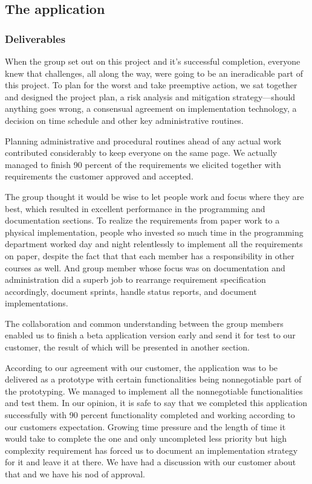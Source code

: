 \subsection{The application}
	
    \subsubsection{Deliverables}
    When the group set out on this project and it's successful completion, everyone knew that challenges, all along the way, were going to be an ineradicable part of this project. To plan for the worst and take preemptive action, we sat together and designed the project plan, a risk analysis and mitigation strategy---should anything goes wrong, a consensual agreement on implementation technology, a decision on time schedule and other key administrative routines.

    Planning administrative and procedural routines ahead of any actual work contributed considerably to keep everyone on the same page. We actually managed to finish 90 percent of the requirements we elicited together with requirements the customer approved and accepted.

    The group thought it would be wise to let people work and focus where they are best, which resulted in excellent performance in the programming and documentation sections. To realize the requirements from paper work to a physical implementation, people who invested so much time in the programming department worked day and night relentlessly to implement all the requirements on paper, despite the fact that that each member has a responsibility in other courses as well. And group member whose focus was on documentation and administration did a superb job to rearrange requirement specification accordingly, document sprints, handle status reports, and document implementations.

    The collaboration and common understanding between the group members enabled us to finish a beta application version early and send it for test to our customer, the result of which will be presented in another section.

    According to our agreement with our customer, the application was to be delivered as a prototype with certain functionalities being nonnegotiable part of the prototyping. We managed to implement all the nonnegotiable functionalities and test them. In our opinion, it is safe to say that we completed this application successfully with 90 percent functionality completed and working according to our customers expectation. Growing time pressure and the length of time it would take to complete the one and only uncompleted less priority but high complexity requirement has forced us to document an implementation strategy for it and leave it at there. We have had a discussion with our customer about that and we have his nod of approval.

